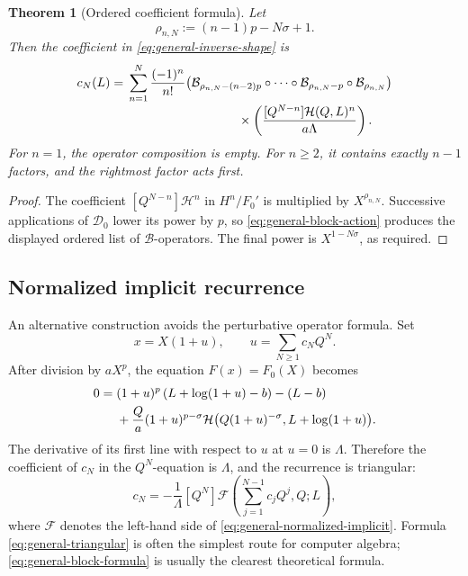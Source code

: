 \documentclass[11pt,oneside]{article}
\theoremstyle{plain}
\newtheorem{theorem}{Theorem}[section]
\theoremstyle{definition}
\theoremstyle{remark}
\newcommand{\Fcal}{\mathcal{F}}
\newcommand{\Hcal}{\mathcal{H}}
\newcommand{\Bcal}{\mathcal{B}}
\begin{document}
\begin{theorem}[Ordered coefficient formula]
\label{thm:general-block-formula}
Let
\begin{equation}
 \rho_{n,N}:=(n-1)p-N\sigma+1.
 \label{eq:rho-nN}
\end{equation}
Then the coefficient in \cref{eq:general-inverse-shape} is
\begin{align}
 c_N(L)
 ={}&\sum_{n=1}^{N}\frac{(-1)^n}{n!}
 \bigl(
   \Bcal_{\rho_{n,N}-(n-2)p}
   \circ\cdots\circ
   \Bcal_{\rho_{n,N}-p}
   \circ\Bcal_{\rho_{n,N}}
 \bigr)
 \notag\\[-0.2em]
 &\hspace{31mm}\times
 \left(
  \frac{[Q^{N-n}]\Hcal(Q,L)^n}{a\Lambda}
 \right).
 \label{eq:general-block-formula}
\end{align}
For \(n=1\), the operator composition is empty.  For \(n\ge2\), it contains
exactly \(n-1\) factors, and the rightmost factor acts first.
\end{theorem}

\begin{proof}
The coefficient \([Q^{N-n}]\Hcal^n\) in \(H^n/F_0'\) is multiplied by
\(X^{\rho_{n,N}}\).  Successive applications of \(\mathscr D_0\) lower its
power by \(p\), so \cref{eq:general-block-action} produces the displayed
ordered list of \(\Bcal\)-operators.  The final power is \(X^{1-N\sigma}\),
as required.
\end{proof}

\subsection{Normalized implicit recurrence}

An alternative construction avoids the perturbative operator formula.  Set
\begin{equation}
 x=X(1+u),
 \qquad
 u=\sum_{N\ge1}c_NQ^N.
 \label{eq:general-u}
\end{equation}
After division by \(aX^p\), the equation \(F(x)=F_0(X)\) becomes
\begin{align}
 0={}&(1+u)^p
 \left(L+\log(1+u)-b\right)-(L-b)
 \notag\\
 &+\frac{Q}{a}(1+u)^{p-\sigma}
 \Hcal\bigl(Q(1+u)^{-\sigma},L+\log(1+u)\bigr).
 \label{eq:general-normalized-implicit}
\end{align}
The derivative of its first line with respect to \(u\) at \(u=0\) is
\(\Lambda\).  Therefore the coefficient of \(c_N\) in the \(Q^N\)-equation
is \(\Lambda\), and the recurrence is triangular:
\begin{equation}
 c_N=-\frac1\Lambda[Q^N]
 \Fcal\!\left(\sum_{j=1}^{N-1}c_jQ^j,Q;L\right),
 \label{eq:general-triangular}
\end{equation}
where \(\Fcal\) denotes the left-hand side of
\cref{eq:general-normalized-implicit}.  Formula
\cref{eq:general-triangular} is often the simplest route for computer
algebra; \cref{eq:general-block-formula} is usually the clearest theoretical
formula.
\end{document}
